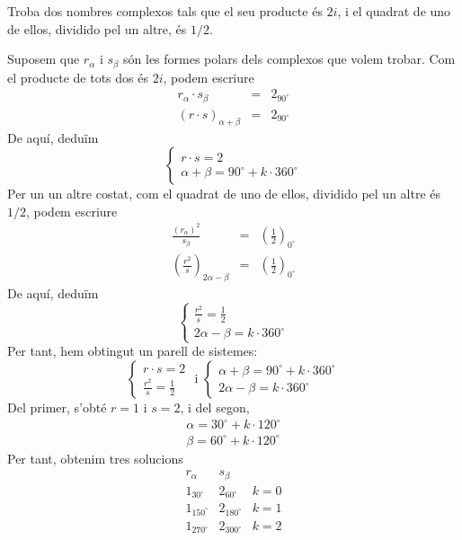 \begin{exercici}
Troba dos nombres complexos tals que el seu producte és $2i$, i el
quadrat de uno de ellos, dividido pel un altre, és $1/2$.
\end{exercici}

\begin{solucio}
Suposem que $r_{\alpha }$ i $s_{\beta }$ són les formes polars dels complexos que volem trobar. Com el producte de tots dos és $2i$, podem
escriure
\begin{eqnarray*}
r_{\alpha }\cdot s_{\beta } &=&2_{90
^{\circ}
} \\
\left( r\cdot s\right) _{\alpha +\beta } &=&2_{90
^{\circ}
}
\end{eqnarray*}
De aquí, deduïm
\[
\left\{
\begin{array}{l}
r\cdot s=2 \\
\alpha +\beta =90
^{\circ}
+k\cdot 360
^{\circ}
\end{array}
\right.
\]
Per un un altre costat, com el quadrat de uno de ellos, dividido pel un altre és $
1/2 $, podem escriure
\begin{eqnarray*}
\frac{\left( r_{\alpha }\right) ^{2}}{s_{\beta }} &=&\left( \frac{1}{2}
\right) _{0
^{\circ}
} \\
\left( \frac{r^{2}}{s}\right) _{2\alpha -\beta } &=&\left( \frac{1}{2}
\right) _{0
^{\circ}
}
\end{eqnarray*}
De aquí, deduïm
\[
\left\{
\begin{array}{l}
\frac{r^{2}}{s}=\frac{1}{2} \\
2\alpha -\beta =k\cdot 360
^{\circ}
\end{array}
\right.
\]
Per tant, hem obtingut un parell de sistemes:
\[
\left\{
\begin{array}{l}
r\cdot s=2 \\
\frac{r^{2}}{s}=\frac{1}{2}
\end{array}
\right. \text{ \ \ \ i \ \ \ }\left\{
\begin{array}{l}
\alpha +\beta =90
^{\circ}
+k\cdot 360
^{\circ}
\\
2\alpha -\beta =k\cdot 360
^{\circ}
\end{array}
\right.
\]
Del primer, s’obté $r=1$ i $s=2$, i del segon,
\[
\begin{array}{l}
\alpha =30
^{\circ}
+k\cdot 120
^{\circ}
\\
\beta =60
^{\circ}
+k\cdot 120
^{\circ}
\end{array}
\]
Per tant, obtenim tres solucions
\[
\begin{array}{lll}
r_{\alpha } & s_{\beta } &  \\
1_{30
^{\circ}
} & 2_{60
^{\circ}
} & k=0 \\
1_{150
^{\circ}
} & 2_{180
^{\circ}
} & k=1 \\
1_{270
^{\circ}
} & 2_{300
^{\circ}
} & k=2
\end{array}
\]
\end{solucio}


